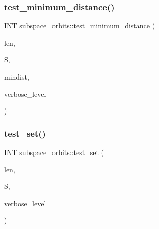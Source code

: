 \subsubsection{\texorpdfstring{test\+\_\+minimum\+\_\+distance()}{test\_minimum\_distance()}}
{\footnotesize\ttfamily \mbox{\hyperlink{galois_8h_a09fddde158a3a20bd2dcadb609de11dc}{I\+NT}} subspace\+\_\+orbits\+::test\+\_\+minimum\+\_\+distance (\begin{DoxyParamCaption}\item[{\mbox{\hyperlink{galois_8h_a09fddde158a3a20bd2dcadb609de11dc}{I\+NT}}}]{len,  }\item[{\mbox{\hyperlink{galois_8h_a09fddde158a3a20bd2dcadb609de11dc}{I\+NT}} $\ast$}]{S,  }\item[{\mbox{\hyperlink{galois_8h_a09fddde158a3a20bd2dcadb609de11dc}{I\+NT}}}]{mindist,  }\item[{\mbox{\hyperlink{galois_8h_a09fddde158a3a20bd2dcadb609de11dc}{I\+NT}}}]{verbose\+\_\+level }\end{DoxyParamCaption})}

\mbox{\label{classsubspace__orbits_a31ec857a81db70159ff826c5a4da7c4e}} 
\subsubsection{\texorpdfstring{test\+\_\+set()}{test\_set()}}
{\footnotesize\ttfamily \mbox{\hyperlink{galois_8h_a09fddde158a3a20bd2dcadb609de11dc}{I\+NT}} subspace\+\_\+orbits\+::test\+\_\+set (\begin{DoxyParamCaption}\item[{\mbox{\hyperlink{galois_8h_a09fddde158a3a20bd2dcadb609de11dc}{I\+NT}}}]{len,  }\item[{\mbox{\hyperlink{galois_8h_a09fddde158a3a20bd2dcadb609de11dc}{I\+NT}} $\ast$}]{S,  }\item[{\mbox{\hyperlink{galois_8h_a09fddde158a3a20bd2dcadb609de11dc}{I\+NT}}}]{verbose\+\_\+level }\end{DoxyParamCaption})}

\mbox{\label{classsubspace__orbits_a9440573e13ae98d29694664bf23bad83}} 
